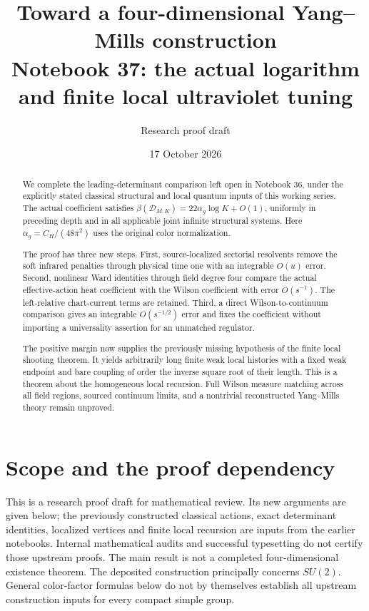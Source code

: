 \documentclass[11pt]{article}
\title{Toward a four-dimensional Yang--Mills construction\\
\large Notebook 37: the actual logarithm and finite local ultraviolet tuning}
\author{Research proof draft}
\date{17 October 2026}
\theoremstyle{remark}
\begin{document}
\maketitle
\begin{abstract}
We complete the leading-determinant comparison left open in Notebook 36,
under the explicitly stated classical structural and local quantum
inputs of this working series. The actual coefficient satisfies
\(\beta(\mathcal D_{M,K})=22\alpha_g\log K+O(1)\), uniformly in
preceding depth and in all applicable joint infinite structural systems.
Here \(\alpha_g=C_H/(48\pi^2)\) uses the original color normalization.

The proof has three new steps. First, source-localized sectorial
resolvents remove the soft infrared penalties through physical time
one with an integrable \(O(u)\) error. Second, nonlinear Ward identities
through field degree four compare the actual effective-action heat
coefficient with the Wilson coefficient with error \(O(s^{-1})\).
The left-relative chart-current terms are retained. Third, a direct
Wilson-to-continuum comparison gives an integrable \(O(s^{-1/2})\)
error and fixes the coefficient without importing a universality
assertion for an unmatched regulator.

The positive margin now supplies the previously missing hypothesis
of the finite local shooting theorem. It yields arbitrarily long
finite weak local histories with a fixed weak endpoint and bare
coupling of order the inverse square root of their length.
This is a theorem about the homogeneous local recursion.
Full Wilson measure matching across all field regions, sourced
continuum limits, and a nontrivial reconstructed Yang--Mills theory
remain unproved.
\end{abstract}

\section*{Scope and the proof dependency}

This is a research proof draft for mathematical review. Its new
arguments are given below; the previously constructed classical actions,
exact determinant identities, localized vertices and finite local
recursion are inputs from the earlier notebooks. Internal mathematical
audits and successful typesetting do not certify those upstream proofs.
The main result is not a completed four-dimensional existence theorem.
The deposited construction principally concerns \(SU(2)\).
General color-factor formulas below do not by themselves establish
all upstream construction inputs for every compact simple group.
\end{document}
